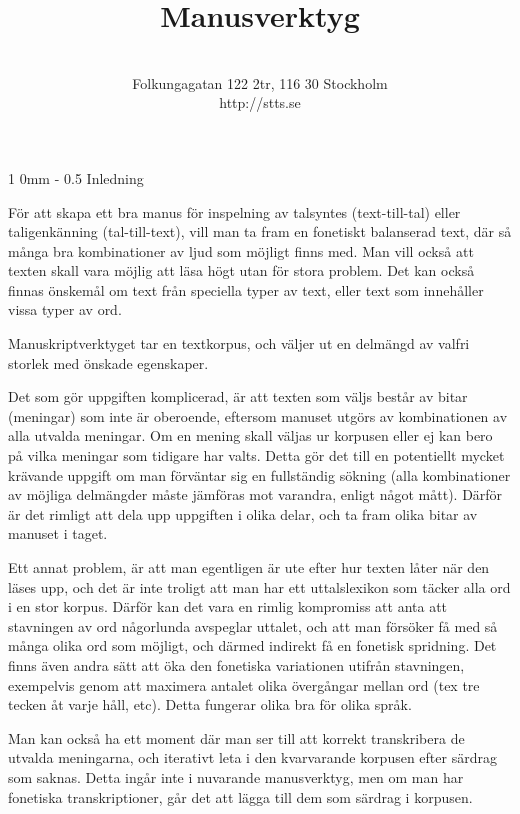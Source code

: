 \documentclass[11pt, a4paper, twoside]{article}
\title{Manusverktyg}
\author{ \stts \\
  Folkungagatan 122 2tr, 116 30 Stockholm\\
  http://stts.se }
\makeatletter
\renewcommand{\section}{\@startsection
  {section}%
  {1}%
  {0mm}%
  {-\baselineskip}%
  {0.5\baselineskip}%
  {\bfseries\sffamily\Large}}%
\makeatother
\begin{document}
\maketitle
\cfoot{\thepage (\pageref{LastPage})}  

\tableofcontents

\newpage


\section{Inledning}

För att skapa ett bra manus för inspelning av talsyntes (text-till-tal) eller taligenkänning (tal-till-text), vill man ta fram en fonetiskt balanserad text, där så många bra kombinationer av ljud som möjligt finns med. Man vill också att texten skall vara möjlig att läsa högt utan för stora problem. Det kan också finnas önskemål om text från speciella typer av text, eller text som innehåller vissa typer av ord.

Manuskriptverktyget tar en textkorpus, och väljer ut en delmängd av valfri storlek med önskade egenskaper. 

Det som gör uppgiften komplicerad, är att texten som väljs består av bitar (meningar) som inte är oberoende, eftersom manuset utgörs av kombinationen av alla utvalda meningar. Om en mening skall väljas ur korpusen eller ej kan bero på vilka meningar som tidigare har valts. Detta gör det till en potentiellt mycket krävande uppgift om man förväntar sig en fullständig sökning (alla kombinationer av möjliga delmängder måste jämföras mot varandra, enligt något mått). Därför är det rimligt att dela upp uppgiften i olika delar, och ta fram olika bitar av manuset i taget.

Ett annat problem, är att man egentligen är ute efter hur texten låter när den läses upp, och det är inte troligt att man har ett uttalslexikon som täcker alla ord i en stor korpus. Därför kan det vara en rimlig kompromiss att anta att stavningen av ord någorlunda avspeglar uttalet, och att man försöker få med så många olika ord som möjligt, och därmed indirekt få en fonetisk spridning. Det finns även andra sätt att öka den fonetiska variationen utifrån stavningen, exempelvis genom att maximera antalet olika övergångar mellan ord (tex tre tecken åt varje håll, etc). Detta fungerar olika bra för olika språk.

Man kan också ha ett moment där man ser till att korrekt transkribera de utvalda meningarna, och iterativt leta i den kvarvarande korpusen efter särdrag som saknas. Detta ingår inte i nuvarande manusverktyg, men om man har fonetiska transkriptioner, går det att lägga till dem som särdrag i korpusen.
\end{document}
